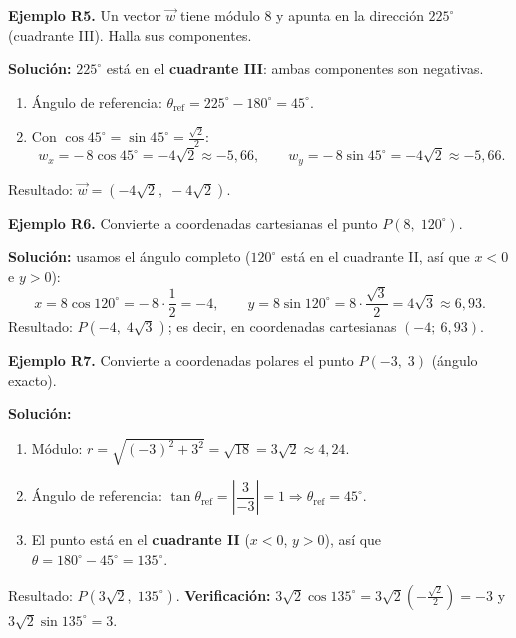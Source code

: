 \documentclass[12pt, letterpaper]{article}
\providecommand{\sen}{\sin}
\begin{document}
\textbf{Ejemplo R5.} Un vector $\vec{w}$ tiene módulo $8$ y apunta en la dirección $225^{\circ}$ (cuadrante III). Halla sus componentes.

\begin{cuadrosolucion}
  \textbf{Solución:} $225^{\circ}$ está en el \textbf{cuadrante III}: ambas componentes son negativas.
  \begin{enumerate}[leftmargin=*, label=\arabic*.]
    \item Ángulo de referencia: $\theta_{\text{ref}} = 225^{\circ} - 180^{\circ} = 45^{\circ}$.
    \item Con $\cos 45^{\circ} = \sen 45^{\circ} = \frac{\sqrt{2}}{2}$:
          $$w_x = -\,8\cos 45^{\circ} = -4\sqrt{2} \approx -5{,}66, \qquad w_y = -\,8\sen 45^{\circ} = -4\sqrt{2} \approx -5{,}66.$$
  \end{enumerate}
  Resultado: $\vec{w} = (-4\sqrt{2},\; -4\sqrt{2})$.
\end{cuadrosolucion}

\textbf{Ejemplo R6.} Convierte a coordenadas cartesianas el punto $P(8,\; 120^{\circ})$.

\begin{cuadrosolucion}
  \textbf{Solución:} usamos el ángulo completo ($120^{\circ}$ está en el cuadrante II, así que $x < 0$ e $y > 0$):
  $$x = 8\cos 120^{\circ} = -\,8 \cdot \frac{1}{2} = -4, \qquad y = 8\sen 120^{\circ} = 8 \cdot \frac{\sqrt{3}}{2} = 4\sqrt{3} \approx 6{,}93.$$
  Resultado: $P(-4,\; 4\sqrt{3})$; es decir, en coordenadas cartesianas $(-4;\ 6{,}93)$.
\end{cuadrosolucion}

\textbf{Ejemplo R7.} Convierte a coordenadas polares el punto $P(-3,\; 3)$ (ángulo exacto).

\begin{cuadrosolucion}
  \textbf{Solución:}
  \begin{enumerate}[leftmargin=*, label=\arabic*.]
    \item Módulo: $r = \sqrt{(-3)^2 + 3^2} = \sqrt{18} = 3\sqrt{2} \approx 4{,}24$.
    \item Ángulo de referencia: $\tan\theta_{\text{ref}} = \left|\dfrac{3}{-3}\right| = 1 \Rightarrow \theta_{\text{ref}} = 45^{\circ}$.
    \item El punto está en el \textbf{cuadrante II} ($x < 0$, $y > 0$), así que $\theta = 180^{\circ} - 45^{\circ} = 135^{\circ}$.
  \end{enumerate}
  Resultado: $P(3\sqrt{2},\; 135^{\circ})$. \textbf{Verificación:} $3\sqrt{2}\cos 135^{\circ} = 3\sqrt{2}\left(-\frac{\sqrt{2}}{2}\right) = -3$ y $3\sqrt{2}\sen 135^{\circ} = 3$. \checkmark
\end{cuadrosolucion}
\end{document}
